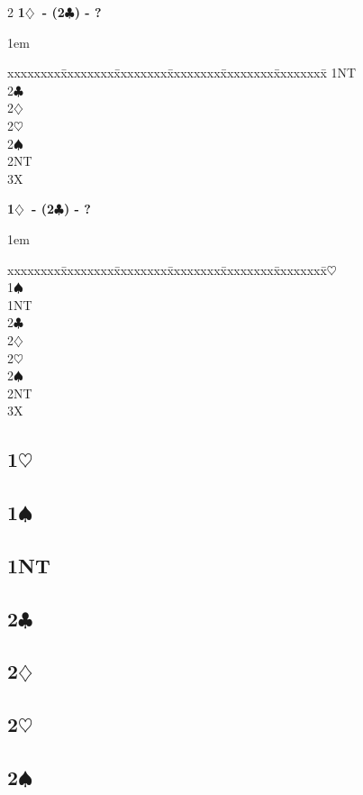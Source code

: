 \documentclass[10pt]{article}
\renewcommand{\c}{$\clubsuit$}
\renewcommand{\d}{$\diamondsuit$}
\newcommand{\h}{$\heartsuit$}
\newcommand{\s}{$\spadesuit$}
\newenvironment{bidtable}[1][]
{\textbf{#1}
  \begin{adjustwidth}{1em}{}
    \addvspace{2pt}
    \begin{tabbing}
      xxxxxxxx\=xxxxxxxx\=xxxxxxxx\=xxxxxxxx\=xxxxxxxx\=xxxxxxxx\=\kill}
{\end{tabbing}\end{adjustwidth}\bigskip}%
\newcommand{\pdfc}{\texorpdfstring{\c{}}{C}}
\newcommand{\pdfd}{\texorpdfstring{\d{}}{D}}
\newcommand{\pdfh}{\texorpdfstring{\h{}}{H}}
\newcommand{\pdfs}{\texorpdfstring{\s{}}{S}}
\begin{document}
\begin{multicols*}{2}
\begin{bidtable}[1\d\ - (2\c) - ?]
1NT \>                                \\
2\c \>                                \\
2\d \>                                \\
2\h \>                                \\
2\s \>                                \\
2NT \>                                \\
3X  \>                                \\
\end{bidtable}
\begin{bidtable}[1\d\ - (2\c) - ?]
1\h \>                                \\
1\s \>                                \\
1NT \>                                \\
2\c \>                                \\
2\d \>                                \\
2\h \>                                \\
2\s \>                                \\
2NT \>                                \\
3X  \>                                \\
\end{bidtable}
\subsection{1\pdfh}
\subsection{1\pdfs}
\subsection{1NT}
\subsection{2\pdfc}
\subsection{2\pdfd}
\subsection{2\pdfh}
\subsection{2\pdfs}

\end{multicols*}
\end{document}

